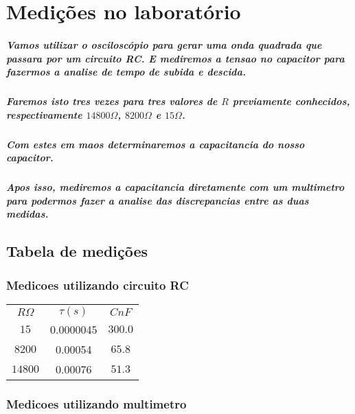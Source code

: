 \documentclass[12pt,twoside, a4paper, twocolumn]{article}
\begin{document}
\section{Medições no laboratório}

\subparagraph*{Vamos utilizar o osciloscópio para gerar uma onda quadrada que passara por um circuito \emph{RC}. E mediremos a tensao no capacitor para fazermos a analise de tempo de subida e descida.}

\subparagraph*{Faremos isto tres vezes para tres valores de $R$ previamente conhecidos, respectivamente $14800 \varOmega$, $8200 \varOmega$ e $15 \varOmega$.}

\subparagraph*{Com estes em maos determinaremos a capacitancia do nosso capacitor.}

\subparagraph*{Apos isso, mediremos a capacitancia diretamente com um multimetro para podermos fazer a analise das discrepancias entre as duas medidas.}

\subsection{Tabela de medições}

\subsubsection{Medicoes utilizando circuito RC}

\begin{center}
    \begin{tabular}{ |c|c|c| }
        \hline
        $R \varOmega$ & $\tau (s)$ & $C nF$  \\
        $15$          & 0.0000045  & $300.0$ \\
        $8200$        & 0.00054    & $65.8$  \\
        $14800$       & 0.00076    & $51.3$  \\
        \hline
    \end{tabular}
\end{center}


\subsubsection{Medicoes utilizando multimetro}
\end{document}
